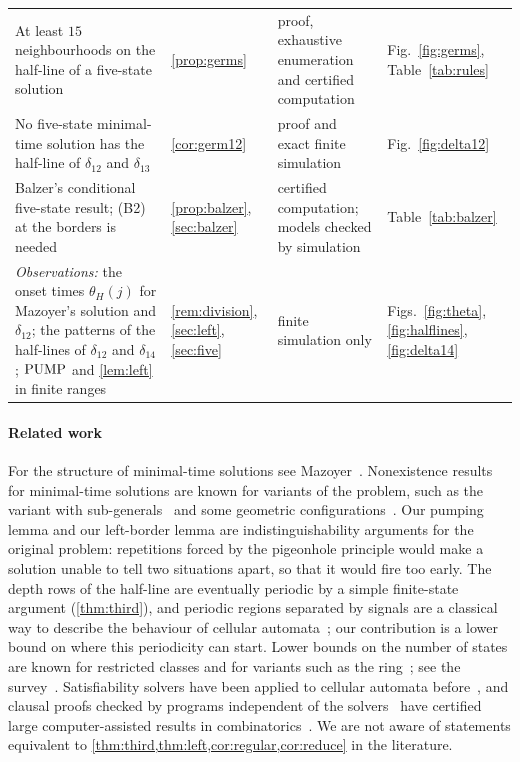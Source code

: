 \begin{table}[tbp]
\begin{tabular}{@{}>{\raggedright\arraybackslash}p{}l>{\raggedright\arraybackslash}p{}>{\raggedright\arraybackslash}p{}@{}}
At least $15$ neighbourhoods on the half-line of a five-state solution & \ref{prop:germs} & proof, exhaustive enumeration and certified computation & Fig.~\ref{fig:germs}, Table~\ref{tab:rules}\\
No five-state minimal-time solution has the half-line of $\delta_{12}$ and $\delta_{13}$ & \ref{cor:germ12} & proof and exact finite simulation & Fig.~\ref{fig:delta12}\\
Balzer's conditional five-state result; (B2) at the borders is needed & \ref{prop:balzer}, \ref{sec:balzer} & certified computation; models checked by simulation & Table~\ref{tab:balzer}\\
\midrule
\emph{Observations:} the onset times $\theta_H(j)$ for Mazoyer's solution and $\delta_{12}$; the patterns of the half-lines of $\delta_{12}$ and $\delta_{14}$; $\mathrm{PUMP}$ and \cref{lem:left} in finite ranges & \ref{rem:division}, \ref{sec:left}, \ref{sec:five} & finite simulation only & Figs.~\ref{fig:theta}, \ref{fig:halflines}, \ref{fig:delta14}\\
\bottomrule
\end{tabular}
\end{table}

\paragraph{Related work}
For the structure of minimal-time solutions see Mazoyer~\cite{Mazoyer96}.
Nonexistence results for minimal-time solutions are known for variants of the
problem, such as the variant with sub-generals~\cite{YamashitaEtAl14} and some
geometric configurations~\cite{Kobayashi19}. Our pumping lemma and our
left-border lemma are indistinguishability arguments for the original problem:
repetitions forced by the pigeonhole principle would make a solution unable to
tell two situations apart, so that it would fire too early. The depth rows of
the half-line are eventually periodic by a simple finite-state argument
(\cref{thm:third}), and periodic regions separated by signals are a classical
way to describe the behaviour of cellular automata~\cite{MazoyerTerrier99};
our contribution is a lower bound on where this periodicity can start. Lower bounds on the number of
states are known for restricted classes and for variants such as the
ring~\cite{BerthiaumeEtAl04}; see the survey~\cite{Correa17}. Satisfiability
solvers have been applied to cellular automata before~\cite{DAntonioDelzanno04},
and clausal proofs checked by programs independent of the
solvers~\cite{WetzlerHeuleHunt14,CruzFilipeEtAl17} have certified large
computer-assisted results in combinatorics~\cite{HeuleKullmannMarek16,Heule18}.
We are not aware
of statements equivalent to
\cref{thm:third,thm:left,cor:regular,cor:reduce} in the literature.

